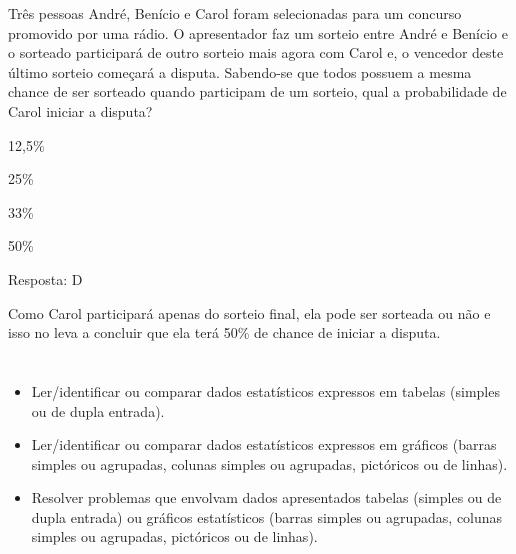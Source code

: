 \begin{escolha}
\begin{escolha}
Três pessoas André, Benício e Carol foram selecionadas para um concurso
promovido por uma rádio. O apresentador faz um sorteio entre André e
Benício e o sorteado participará de outro sorteio mais agora com Carol
e, o vencedor deste último sorteio começará a disputa. Sabendo-se que
todos possuem a mesma chance de ser sorteado quando participam de um
sorteio, qual a probabilidade de Carol iniciar a disputa?

\begin{escolha}
\item
  12,5\%
\item
  25\%
\item
  33\%
\item
  50\%
\end{escolha}

Resposta: D

Como Carol participará apenas do sorteio final, ela pode ser sorteada ou
não e isso no leva a concluir que ela terá 50\% de chance de iniciar a
disputa.

\chapter{}



\begin{itemize}
    \item Ler/identificar ou comparar dados estatísticos expressos em tabelas
(simples ou de dupla entrada).

    \item Ler/identificar ou comparar dados estatísticos expressos em gráficos
(barras simples ou agrupadas, colunas simples ou agrupadas, pictóricos
ou de linhas).

    \item Resolver problemas que envolvam dados apresentados tabelas (simples ou
de dupla entrada) ou gráficos estatísticos (barras simples ou agrupadas,
colunas simples ou agrupadas, pictóricos ou de linhas).
\end{itemize}

\end{escolha}
\end{escolha}
